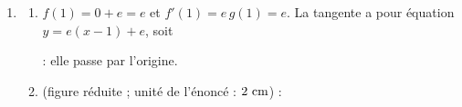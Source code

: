 \begin{enumerate}
\begin{enumerate}
            $(\expo{x}\ln x)' = \expo{x}\ln x + \frac{\expo{x}}{x}$ et
            $\left(\frac{\expo{x}}{x}\right)' = \frac{x\expo{x} - \expo{x}}{x^2} = \frac{\expo{x}}{x} - \frac{\expo{x}}{x^2}$, donc
            \par\noindent{}
         \item {}
            En factorisant par $\expo{x}$ : $f'(x) = \expo{x}\left(\ln x + \frac{2}{x} - \frac{1}{x^2}\right) = \expo{x} g(x)$.
         \item {}
            \par\noindent{}
            : la tangente au point d'abscisse $\alpha$ est horizontale.
         \item {}
            $f(x) = \frac{\expo{x}}{x}(x\ln x + 1)$. En $0^+$ : $x\ln x \to 0$ donc $x \ln x + 1 \to 1$, et
            $\frac{\expo{x}}{x} \to +\infty$ ; 
            En $+\infty$ : $\frac{\expo{x}}{x} \to +\infty$ et $x\ln x + 1 \to +\infty$ ; 
         \item {}
            $\expo{x} > 0$, donc $f'(x)$ a le signe de $g(x)$ :
            \[
               \begin{array}{c|ccccc}
                  x & 0 & & \alpha & & +\infty \\ \hline
                  f'(x) & & - & 0 & + & \\ \hline
                  & +\infty & & & & +\infty \\
                  f & & \searrow & & \nearrow & \\
                  & & & f(\alpha) & &
               \end{array}
            \]
            avec $f(\alpha) \simeq 2{,}1$ ; $f$ admet un minimum $f(\alpha) > 0$.
      \end{enumerate}
   \item
      \begin{enumerate}
         \item {}
            $f(1) = 0 + e = e$ et $f'(1) = e\, g(1) = e$. La tangente a pour \'equation $y = e(x - 1) + e$, soit
            \par\noindent{} : elle passe par l'origine.
         \item {} (figure r\'eduite ; unit\'e de l'\'enonc\'e : $2~\mathrm{cm}$) :

\end{enumerate}
\end{enumerate}
